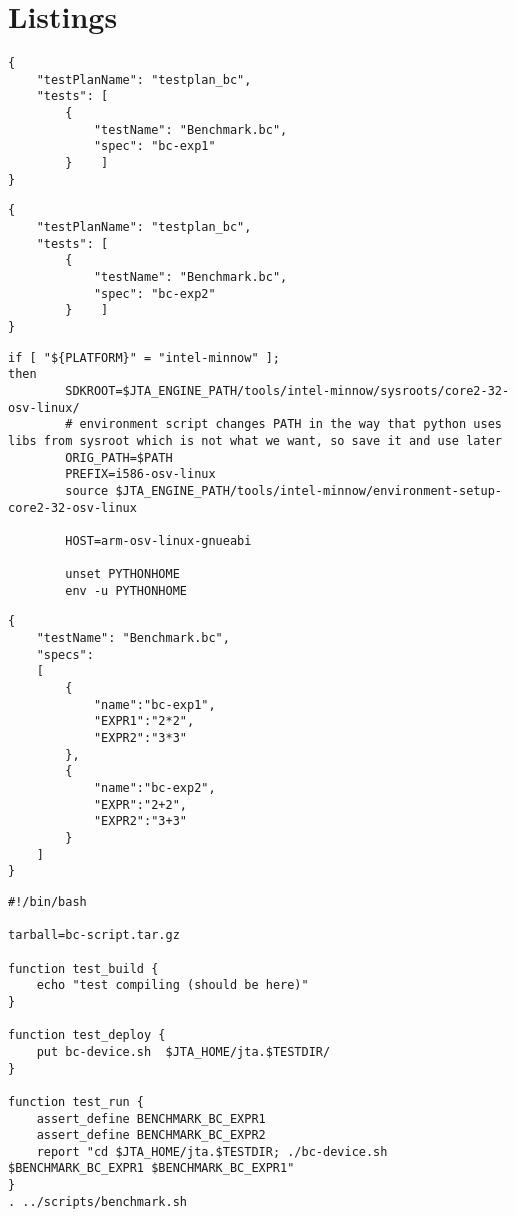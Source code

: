 \section{Listings}
\label{sec:listings}

\begin{lstlisting}[label=testplan-bc-exp1,caption=\texttt{testplan\_bc\_exp1.json} file]
{
    "testPlanName": "testplan_bc",
    "tests": [
        {
            "testName": "Benchmark.bc",
            "spec": "bc-exp1"
        }    ]
}
\end{lstlisting}

\begin{lstlisting}[label=testplan-bc-exp2,caption=\texttt{testplan\_bc\_exp2.json} file]
{
    "testPlanName": "testplan_bc",
    "tests": [
        {
            "testName": "Benchmark.bc",
            "spec": "bc-exp2"
        }    ]
}
\end{lstlisting}


\begin{lstlisting}[label=intel-minnow-tools,caption=\texttt{intel minnow tools} section]
if [ "${PLATFORM}" = "intel-minnow" ];
then
        SDKROOT=$JTA_ENGINE_PATH/tools/intel-minnow/sysroots/core2-32-osv-linux/
        # environment script changes PATH in the way that python uses libs from sysroot which is not what we want, so save it and use later
        ORIG_PATH=$PATH
        PREFIX=i586-osv-linux
        source $JTA_ENGINE_PATH/tools/intel-minnow/environment-setup-core2-32-osv-linux

        HOST=arm-osv-linux-gnueabi
        
        unset PYTHONHOME
        env -u PYTHONHOME
\end{lstlisting}

\begin{lstlisting}[label=spec-bc,caption=\texttt{Benchmark.bc.spec} file]
  {
    "testName": "Benchmark.bc",
    "specs": 
    [
        {
            "name":"bc-exp1",
            "EXPR1":"2*2",
            "EXPR2":"3*3"
        },
        {
            "name":"bc-exp2",
            "EXPR":"2+2",
            "EXPR2":"3+3"
        }
    ]
}
\end{lstlisting}

\begin{lstlisting}[label=bc-script,caption=\texttt{bc-script.sh} file]
#!/bin/bash

tarball=bc-script.tar.gz

function test_build {
    echo "test compiling (should be here)"
}

function test_deploy {
	put bc-device.sh  $JTA_HOME/jta.$TESTDIR/
}

function test_run {
    assert_define BENCHMARK_BC_EXPR1
    assert_define BENCHMARK_BC_EXPR2
    report "cd $JTA_HOME/jta.$TESTDIR; ./bc-device.sh $BENCHMARK_BC_EXPR1 $BENCHMARK_BC_EXPR1"  
}
. ../scripts/benchmark.sh
\end{lstlisting}


